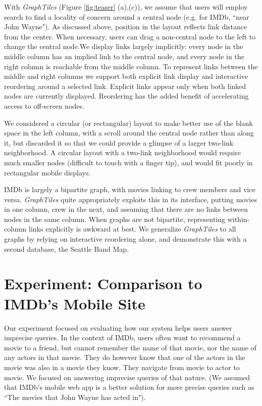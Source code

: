 \documentclass{sigchi}
\begin{document}
With \textit{GraphTiles} (Figure \ref{fig:teaser} (a),(c)), we assume that users will employ search to find a locality of concern around a central node (e.g. for IMDb, ``near John Wayne"). As discussed above, position in the layout reflects link distance from the center. When necessary, users can drag a non-central node to the left to change the central node.We display links largely implicitly: every node in the middle column has an implied link to the central node, and every node in the right column is reachable from the middle column. To represent links between the middle and right columns we support both explicit link display and interactive reordering around a selected link. Explicit links appear only when both linked nodes are currently displayed. Reordering has the added benefit of accelerating access to off-screen nodes.

We considered a circular (or rectangular) layout to make better use of the blank space in the left column, with a scroll around the central node rather than along it, but discarded it so that we could provide a glimpse of a larger two-link neighborhood. A circular layout with a two-link neighborhood would require much smaller nodes (difficult to touch with a finger tip), and would fit poorly in rectangular mobile displays.

IMDb is largely a bipartite graph, with movies linking to crew members and vice versa. \textit{GraphTiles} quite appropriately exploits this in its interface, putting movies in one column, crew in the next, and assuming that there are no links between nodes in the same column. When graphs are not bipartite, representing within-column links explicitly is awkward at best. We generalize \textit{GraphTiles} to all graphs by relying on interactive reordering alone, and demonstrate this with a second database, the Seattle Band Map.


\section{Experiment: Comparison to IMDb's Mobile Site}



Our experiment focused on evaluating how our system helps users answer imprecise queries. In the context of IMDb, users often want to recommend a movie to a friend, but cannot remember the name of that movie, nor the name of any actors in that movie. They do however know that one of the actors in the movie was also in a movie they know. They navigate from movie to actor to movie. We focused on answering imprecise queries of that nature. (We assumed that IMDb's mobile web app is a better solution for more precise queries such as ``The movies that John Wayne has acted in"). 
\end{document}
